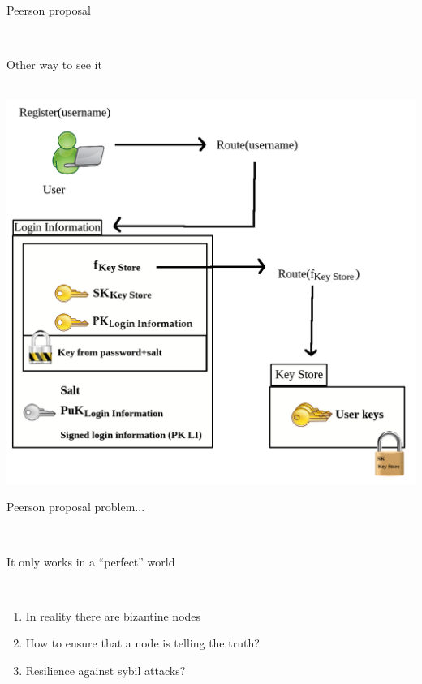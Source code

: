 \documentclass[12pt]{beamer}
\renewcommand{\frametitle}[1]{\vspace{0.2cm}\begin{huge}#1\end{huge}\\}
\renewcommand{\framesubtitle}[1]{\vspace{0.4cm} \hspace{0.4cm}\begin{large}#1\end{large}\\}
\begin{document}
  \begin{frame}
  \frametitle{Peerson proposal}
  \framesubtitle{Other way to see it}
  \center
  \includegraphics[height=0.7\textheight]{../../../img/password_peerson_alternative}\\
  \end{frame}

  \begin{frame}
  \frametitle{Peerson proposal problem...}
  \framesubtitle{It only works in a ``perfect'' world}

  \begin{enumerate}
    \item In reality there are bizantine nodes
    \item How to ensure that a node is telling the truth?
    \item Resilience against sybil attacks?
  \end{enumerate}
  \end{frame}
  
  
\end{document}
